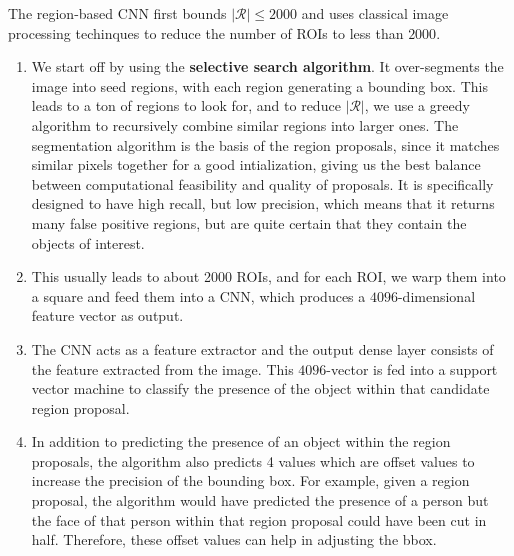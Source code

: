 \documentclass{article}
\begin{document}
    The region-based CNN first bounds $|\mathcal{R}| \leq 2000$ and uses classical image processing techinques to reduce the number of ROIs to less than $2000$. 
    \begin{enumerate} 
      \item We start off by using the \textbf{selective search algorithm}. It over-segments the image into seed regions, with each region generating a bounding box. This leads to a ton of regions to look for, and to reduce $|\mathcal{R}|$, we use a greedy algorithm to recursively combine similar regions into larger ones. The segmentation algorithm is the basis of the region proposals, since it matches similar pixels together for a good intialization, giving us the best balance between computational feasibility and quality of proposals. It is specifically designed to have high recall, but low precision, which means that it returns many false positive regions, but are quite certain that they contain the objects of interest.  
        \begin{center} 
        \end{center}
      
      \item This usually leads to about 2000 ROIs, and for each ROI, we warp them into a square and feed them into a CNN, which produces a $4096$-dimensional feature vector as output. 

      \item The CNN acts as a feature extractor and the output dense layer consists of the feature extracted from the image. This $4096$-vector is fed into a support vector machine to classify the presence of the object within that candidate region proposal. 
        \begin{center}
        \end{center}

      \item In addition to predicting the presence of an object within the region proposals, the algorithm also predicts 4 values which are offset values to increase the precision of the bounding box. For example, given a region proposal, the algorithm would have predicted the presence of a person but the face of that person within that region proposal could have been cut in half. Therefore, these offset values can help in adjusting the bbox.  
        \begin{center}
        \end{center}
    \end{enumerate}
\end{document}
